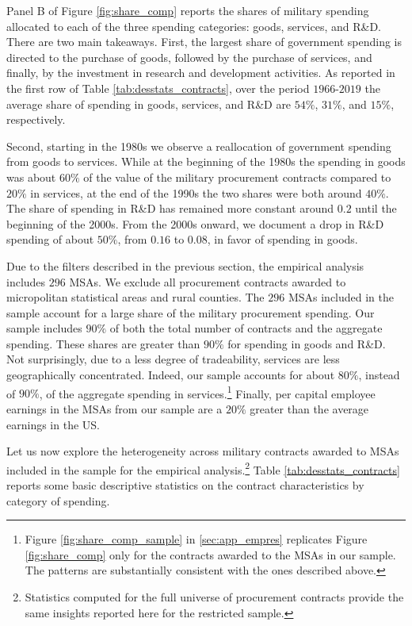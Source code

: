 \documentclass[dv_diss_main.tex]{subfiles}
\begin{document}
Panel B of Figure \ref{fig:share_comp} reports the shares of military spending allocated to each of the three spending categories: goods, services, and R\&D. There are two main takeaways. First, the largest share of government spending is directed to the purchase of goods, followed by the purchase of services, and finally, by the investment in research and development activities. As reported in the first row of Table \ref{tab:desstats_contracts}, over the period $1966$-$2019$ the average share of spending in goods, services, and R\&D are $54\%$, $31\%$, and $15\%$, respectively.

Second, starting in the 1980s we observe a reallocation of government spending from goods to services. While at the beginning of the 1980s the spending in goods was about $60\%$ of the value of the military procurement contracts compared to $20\%$ in services, at the end of the 1990s the two shares were both around $40\%$. The share of spending in R\&D has remained more constant around $0.2$ until the beginning of the 2000s. From the 2000s onward, we document a drop in R\&D spending of about $50\%$, from $0.16$ to $0.08$, in favor of spending in goods.

Due to the filters described in the previous section, the empirical analysis includes $296$ MSAs. We exclude all procurement contracts awarded to micropolitan statistical areas and rural counties. The $296$ MSAs included in the sample account for a large share of the military procurement spending. Our sample includes $90\%$ of both the total number of contracts and the aggregate spending. These shares are greater than $90\%$ for spending in goods and R\&D. Not surprisingly, due to a less degree of tradeability, services are less geographically concentrated. Indeed, our sample accounts for about $80\%$, instead of $90\%$, of the aggregate spending in services.\footnote{Figure \ref{fig:share_comp_sample} in \ref{sec:app_empres} replicates Figure \ref{fig:share_comp} only for the contracts awarded to the MSAs in our sample. The patterns are substantially consistent with the ones described above.} Finally, per capital employee earnings in the MSAs from our sample are a $20\%$ greater than the average earnings in the US.

Let us now explore the heterogeneity across military contracts awarded to MSAs included in the sample for the empirical analysis.\footnote{Statistics computed for the full universe of procurement contracts provide the same insights reported here for the restricted sample.} Table \ref{tab:desstats_contracts} reports some basic descriptive statistics on the contract characteristics by category of spending. 
\end{document}
